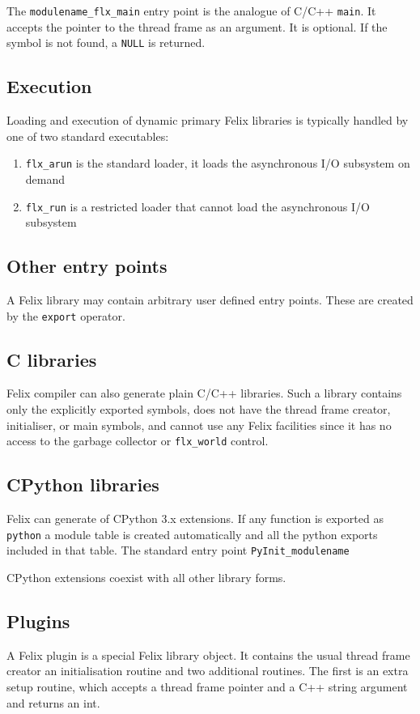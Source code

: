 \documentclass[oneside]{book}
\begin{document}
The \verb$modulename_flx_main$ entry point is the analogue of C/C++ \verb$main$.
It accepts the pointer to the thread frame as an argument.
It is optional. If the symbol is not found, a \verb$NULL$ is returned.

\subsection{Execution}
Loading and execution of dynamic primary Felix libraries is typically
handled by one of two standard executables:

\begin{enumerate}
\item \verb$flx_arun$ is the standard loader, it loads the asynchronous I/O subsystem on demand
\item \verb$flx_run$ is a restricted loader that cannot load the asynchronous I/O subsystem
\end{enumerate}


\subsection{Other entry points}
A Felix library may contain arbitrary user defined entry points.
These are created by the \verb$export$ operator.

\subsection{C libraries}
Felix compiler can also generate plain C/C++ libraries.
Such a library contains only the explicitly exported symbols,
does not have the thread frame creator, initialiser, or main
symbols, and cannot use any Felix facilities since it has
no access to the garbage collector or \verb$flx_world$ control.

\subsection{CPython libraries}
Felix can generate of CPython 3.x extensions.  If any 
function is exported as \verb$python$ a module table is
created automatically and all the python exports included
in that table. The standard entry point \verb$PyInit_modulename$

CPython extensions coexist with all other library forms.

\subsection{Plugins}
A Felix plugin is a special Felix library object.
It contains the usual thread frame creator an initialisation
routine and two additional routines. The first is an extra
setup routine, which accepts a thread frame pointer and a 
C++ string argument and returns an int.
\end{document}
